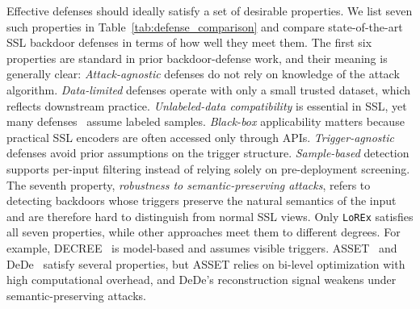 \documentclass[letterpaper,twocolumn,10pt]{article}
\begin{document}
\par Effective defenses should ideally satisfy a set of desirable properties. We list seven such properties in Table~\ref{tab:defense_comparison} and compare state-of-the-art SSL backdoor defenses in terms of how well they meet them. The first six properties are standard in prior backdoor-defense work, and their meaning is generally clear:
\textit{Attack-agnostic} defenses do not rely on knowledge of the attack algorithm.
\textit{Data-limited} defenses operate with only a small trusted dataset, which reflects downstream practice.
\textit{Unlabeled-data compatibility} is essential in SSL, yet many defenses~\cite{chen2018detecting,liu2019abs,tran2018spectral,tang2021demon} assume labeled samples.
\textit{Black-box} applicability matters because practical SSL encoders are often accessed only through APIs.
\textit{Trigger-agnostic} defenses avoid prior assumptions on the trigger structure.
\textit{Sample-based} detection supports per-input filtering instead of relying solely on pre-deployment screening.
The seventh property, \textit{robustness to semantic-preserving attacks}, refers to detecting backdoors whose triggers preserve the natural semantics of the input and are therefore hard to distinguish from normal SSL views. Only \texttt{LoREx} satisfies all seven properties, while other approaches meet them to different degrees. For example, DECREE~\cite{feng2023detecting} is model-based and assumes visible triggers. ASSET~\cite{asset} and DeDe~\cite{hou2025dede} satisfy several properties, but ASSET relies on bi-level optimization with high computational overhead, and DeDe's reconstruction signal weakens under semantic-preserving attacks.


\end{document}
